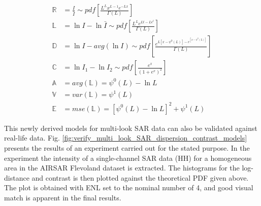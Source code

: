 \documentclass[journal]{IEEEtran}
\begin{document}
  \begin{align*}
    \mathbb{R} &= \frac{I}{\bar{I}} \sim pdf \left[ \frac{ L^{L} x^{L-1} e^{-Lx}}{ \Gamma(L)} \label{eqn:multi_look_SAR_ratio_dist} \right]\\
    \mathbb{L} &= \ln{I} - \ln{\bar{I}} \sim pdf \left[ \frac{L^Le^{Lt-Le^t}}{ \Gamma(L)}  \right] \\
    \mathbb{D} &= \ln{I} - avg(\ln{I}) \sim pdf \left[ \frac{e^{L[x-\psi^0(L)]-e^{[x-\psi^0(L)]}}}{\Gamma(L)} \right] \\
    \mathbb{C} &= \ln{I_1} - \ln{I_2} \sim pdf \left[ \frac{e^{x}}{(1+e^x)^{2}} \right] \\
    \mathbb{A} &= avg(\mathbb{L}) = \psi^0(L) - \ln{L} \\
    \mathbb{V} &= var(\mathbb{L}) = \psi^1(L) \\
    \mathbb{E} &= mse(\mathbb{L}) = \left[ \psi^0(L) - \ln{L} \right]^2 + \psi^1(L)
  \end{align*}

This newly derived models for multi-look SAR data can also be validated against real-life data.
Fig. \ref{fig:verify_multi_look_SAR_dispersion_contrast_models} presents the results of an experiment carried out for the stated purpose.
In the experiment the intensity of a single-channel SAR data (HH) for a homogeneous area in the AIRSAR Flevoland dataset is extracted.
The histograms for the log-distance and contrast is then plotted against the theoretical PDF given above.
 The plot is obtained with ENL set to the nominal number of 4, and  good visual match is apparent in the final results.
\end{document}
